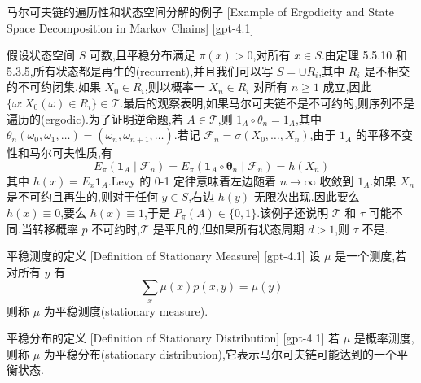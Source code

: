 \documentclass[UTF8]{ctexart}
\begin{document}
    \begin{xmp}
        {马尔可夫链的遍历性和状态空间分解的例子}
        [Example of Ergodicity and State Space Decomposition in Markov Chains]
        [gpt-4.1]
        
假设状态空间 $S$ 可数,且平稳分布满足 $\pi(x) > 0$,对所有 $x \in S$.由定理 5.5.10 和 5.3.5,所有状态都是再生的(recurrent),并且我们可以写 $S = \cup R_{i}$,其中 $R_{i}$ 是不相交的不可约闭集.如果 $X_{0} \in R_{i}$,则以概率一 $X_{n} \in R_{i}$ 对所有 $n \geq 1$ 成立,因此 $\{\omega : X_{0}(\omega) \in R_{i}\} \in \mathcal{T}$.最后的观察表明,如果马尔可夫链不是不可约的,则序列不是遍历的(ergodic).为了证明逆命题,若 $\mathit{A} \in \mathcal{T}$,则 $1_{A} \circ \theta_{n} = 1_{A}$,其中 $\theta_{n}(\omega_{0}, \omega_{1}, \ldots) = (\omega_{n}, \omega_{n+1}, \ldots)$.若记 $\mathcal{F}_{n} = \sigma(X_{0}, \ldots, X_{n})$,由于 $1_{A}$ 的平移不变性和马尔可夫性质,有
\[
E_{\pi}(\mathbf{1}_{A} \mid \mathcal{F}_{n}) = E_{\pi}(\mathbf{1}_{A} \circ \boldsymbol{\theta}_{n} \mid \mathcal{F}_{n}) = h(X_{n})
\]
其中 $h(x) = E_{x} \mathbf{1}_{A}$.Levy 的 0-1 定律意味着左边随着 $n \to \infty$ 收敛到 $1_{A}$.如果 $X_{n}$ 是不可约且再生的,则对于任何 $y \in S$,右边 $h(y)$ 无限次出现.因此要么 $h(x) \equiv 0$,要么 $h(x) \equiv 1$,于是 $P_{\pi}(A) \in \{0, 1\}$.该例子还说明 $\mathcal{T}$ 和 $\tau$ 可能不同.当转移概率 $p$ 不可约时,$\mathcal{T}$ 是平凡的,但如果所有状态周期 $d > 1$,则 $\tau$ 不是.

    \end{xmp}
    
    
    
    \begin{dfn}
        {平稳测度的定义}
        [Definition of Stationary Measure]
        [gpt-4.1]
        设 $\mu$ 是一个测度,若对所有 $y$ 有
\[
\sum_{x} \mu(x) p(x, y) = \mu(y)
\]
则称 $\mu$ 为平稳测度(stationary measure).
    \end{dfn}
    
    
    
    \begin{dfn}
        {平稳分布的定义}
        [Definition of Stationary Distribution]
        [gpt-4.1]
        若 $\mu$ 是概率测度,则称 $\mu$ 为平稳分布(stationary distribution),它表示马尔可夫链可能达到的一个平衡状态.
    \end{dfn}
    
    
    
\end{document}
